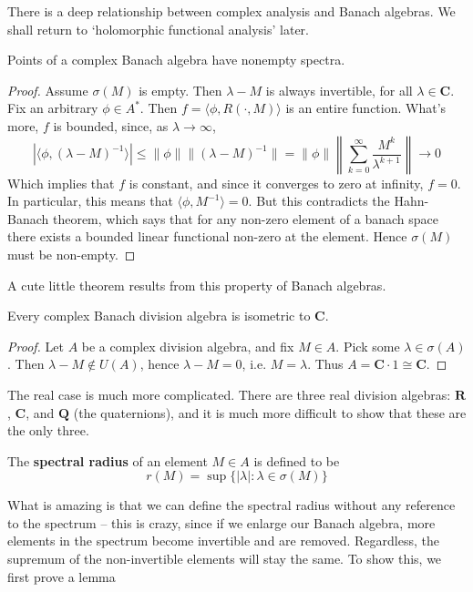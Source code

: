 There is a deep relationship between complex analysis and Banach algebras. We shall return to `holomorphic functional analysis' later.

\begin{theorem}
    Points of a complex Banach algebra have nonempty spectra.
\end{theorem}
\begin{proof}
    Assume $\sigma(M)$ is empty. Then $\lambda - M$ is always invertible, for all $\lambda \in \mathbf{C}$. Fix an arbitrary $\phi \in A^*$. Then $f = \langle \phi, R(\cdot, M) \rangle$ is an entire function. What's more, $f$ is bounded, since, as $\lambda \to \infty$,
    \[ | \langle \phi, (\lambda - M)^{-1} \rangle | \leq \| \phi \| \| (\lambda - M)^{-1} \| = \| \phi \| \left\| \sum_{k = 0}^\infty \frac{M^k}{\lambda^{k+1}} \right\| \to 0 \]
    Which implies that $f$ is constant, and since it converges to zero at infinity, $f = 0$. In particular, this means that $\langle \phi, M^{-1} \rangle = 0$. But this contradicts the Hahn-Banach theorem, which says that for any non-zero element of a banach space there exists a bounded linear functional non-zero at the element. Hence $\sigma(M)$ must be non-empty.
\end{proof}

A cute little theorem results from this property of Banach algebras.

\begin{corollary}
    Every complex Banach division algebra is isometric to $\mathbf{C}$.
\end{corollary}
\begin{proof}
    Let $A$ be a complex division algebra, and fix $M \in A$. Pick some $\lambda \in \sigma(A)$. Then $\lambda - M \not \in U(A)$, hence $\lambda - M = 0$, i.e. $M = \lambda$. Thus $A = \mathbf{C} \cdot 1 \cong \mathbf{C}$.
\end{proof}

The real case is much more complicated. There are three real division algebras: $\mathbf{R}$, $\mathbf{C}$, and $\mathbf{Q}$ (the quaternions), and it is much more difficult to show that these are the only three.

\begin{definition}
    The {\bf spectral radius} of an element $M \in A$ is defined to be
    \[ r(M) = \sup \{ |\lambda| : \lambda \in \sigma(M) \} \]
\end{definition}

What is amazing is that we can define the spectral radius without any reference to the spectrum -- this is crazy, since if we enlarge our Banach algebra, more elements in the spectrum become invertible and are removed. Regardless, the supremum of the non-invertible elements will stay the same. To show this, we first prove a lemma

